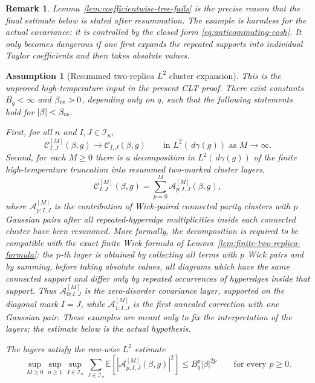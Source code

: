 \documentclass[11pt]{article}
\newtheorem{assumption}[theorem]{Assumption}
\newtheorem{remark}[theorem]{Remark}
\newcommand{\E}{\mathbb{E}}
\newcommand{\calI}{\mathcal{I}}
\newcommand{\dd}{\,d}
\begin{document}
\begin{remark}
  Lemma~\ref{lem:coefficientwise-tree-fails} is the precise reason that the
  final estimate below is stated after resummation.  The example is harmless
  for the actual covariance: it is controlled by the closed form
  \eqref{eq:anticommuting-cosh}.  It only becomes dangerous if one first
  expands the repeated supports into individual Taylor coefficients and then
  takes absolute values.
\end{remark}

\begin{assumption}[Resummed two-replica $L^2$ cluster expansion]
  \label{ass:two-replica-cluster-expansion}
  This is the unproved high-temperature input in the present CLT proof.
  There exist constants $B_q<\infty$ and $\beta_{\rm ce}>0$, depending only on
  $q$, such that the following statements hold for $|\beta|<\beta_{\rm ce}$.

  First, for all $n$ and $I,J\in\calI_n$,
  \begin{equation}\label{eq:cluster-convergence}
    \mathcal C^{[M]}_{I,J}(\beta,g)
    \to
    \mathcal C_{I,J}(\beta,g)
    \qquad
    \text{in }L^2(\dd\gamma(g))
    \text{ as }M\to\infty.
  \end{equation}
  Second, for each $M\geq0$ there is a decomposition in $L^2(\dd\gamma(g))$
  of the finite high-temperature truncation into resummed two-marked cluster
  layers,
  \begin{equation}\label{eq:resummed-layer-decomposition}
    \mathcal C^{[M]}_{I,J}(\beta,g)
    =
    \sum_{p=0}^M
    \mathcal A^{[M]}_{p;I,J}(\beta,g),
  \end{equation}
  where $\mathcal A^{[M]}_{p;I,J}$ is the contribution of Wick-paired connected
  parity clusters with $p$ Gaussian pairs after all repeated-hyperedge
  multiplicities inside each connected cluster have been resummed.  More
  formally, the decomposition is required to be compatible with the exact
  finite Wick formula of Lemma~\ref{lem:finite-two-replica-formula}: the
  $p$-th layer is obtained by collecting all terms with $p$ Wick pairs and by
  summing, before taking absolute values, all diagrams which have the same
  connected support and differ only by repeated occurrences of hyperedges
  inside that support.  Thus $\mathcal A^{[M]}_{0;I,J}$ is the zero-disorder
  covariance layer, supported on the diagonal mark $I=J$, while
  $\mathcal A^{[M]}_{1;I,J}$ is the first annealed correction with one Gaussian
  pair.  These examples are meant only to fix the interpretation of the layers;
  the estimate below is the actual hypothesis.

  The layers satisfy the row-wise $L^2$ estimate
  \begin{equation}\label{eq:resummed-layer-bound}
    \sup_{M\geq0}
    \sup_{n\geq1}
    \sup_{I\in\calI_n}
    \sum_{J\in\calI_n}
    \E\left[
      \left|
        \mathcal A^{[M]}_{p;I,J}(\beta,g)
      \right|^2
    \right]
    \leq
    B_q^p|\beta|^{2p}
    \qquad
    \text{for every }p\geq0.
  \end{equation}
\end{assumption}
\end{document}
